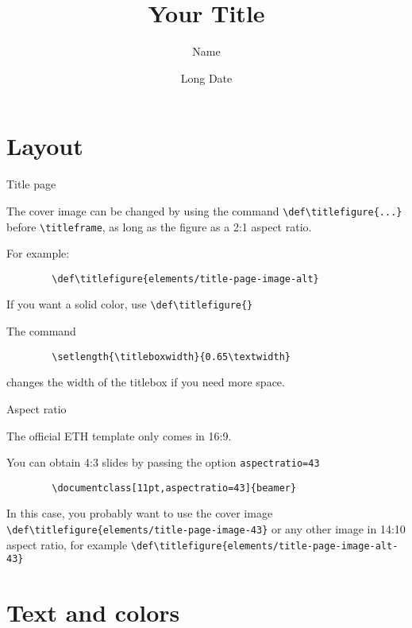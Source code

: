 \documentclass[11pt,aspectratio=169]{beamer}
\date[Short Date]{Long Date}
\author{Name}
\institute{Institute}
\title{Your Title}
\def\titlefigure{elements/title-page-image}		%
\begin{document}
\titleframe

\tocframe

\section{Layout}


\begin{frame}[fragile]{Title page}

	The cover image can be changed by using the command \verb+\def\titlefigure{...}+ before \verb+\titleframe+, as long as the figure as a 2:1 aspect ratio.
	
	For example:
	\begin{verbatim}
		\def\titlefigure{elements/title-page-image-alt}
	\end{verbatim}
	
	\medskip
	
	If you want a solid color, use \verb+\def\titlefigure{}+
	
	\medskip

	The command	
	\begin{verbatim}
		\setlength{\titleboxwidth}{0.65\textwidth}
	\end{verbatim}
	changes the width of the titlebox if you need more space.

\end{frame}

\begin{frame}[fragile]{Aspect ratio}

	The official ETH template only comes in 16:9.
	
	You can obtain 4:3 slides by passing the option \verb+aspectratio=43+
	\begin{verbatim}
		\documentclass[11pt,aspectratio=43]{beamer}	
	\end{verbatim}
		
	\bigskip
	
	In this case, you probably want to use the cover image \verb+\def\titlefigure{elements/title-page-image-43}+
	or any other image in 14:10 aspect ratio, for example \verb+\def\titlefigure{elements/title-page-image-alt-43}+
	
	
\end{frame}

\section{Text and colors}
\end{document}
